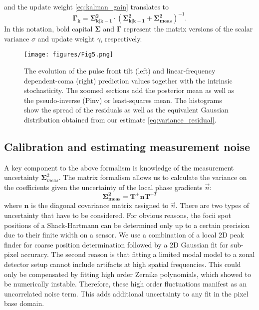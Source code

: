 \documentclass[9pt, twocolumn,superscriptaddress]{revtex4}
\begin{document}
and the update weight \cref{eq:kalman_gain} translates to
\begin{equation}
    \boldsymbol{\Gamma_k} = \boldsymbol{\Sigma^2_{k|k-1}}\cdot\left( \boldsymbol{\Sigma^2_{k|k-1}} +\boldsymbol{\Sigma^2_\text{meas}}\right)^{-1}.
\end{equation}
In this notation, bold capital $\boldsymbol{\Sigma}$ and $\boldsymbol{\Gamma}$ represent the matrix versions of the scalar variance $\sigma$ and update weight $\gamma$, respectively.

\begin{figure*}[]
    \centering
    \texttt{[image: figures/Fig5.png]}
    \caption{The evolution of the pulse front tilt (left) and linear-frequency dependent-coma (right) prediction values together with the intrinsic stochasticity. The zoomed sections add the posterior mean as well as the pseudo-inverse (Pinv) or least-squares mean. The histograms show the spread of the residuals as well as the equivalent Gaussian distribution obtained from our estimate \cref{eq:variance_residual}.}
    \label{fig:pft_plot}
\end{figure*}

\subsection{Calibration and estimating measurement noise}\label{sec:measurement-noise}

A key component to the above formalism is knowledge of the measurement uncertainty $\boldsymbol{\Sigma}^2_{meas}$. The matrix formalism allows us to calculate the variance on the coefficients given the uncertainty of the local phase gradients $\vec{n}$:
\begin{equation}
    \boldsymbol{\Sigma^2_\text{meas}} = \mathbf{T^+} \mathbf{n} \mathbf{T}^{+T}
\end{equation}
where $\mathbf{n}$ is the diagonal covariance matrix assigned to $\vec{n}$.
There are two types of uncertainty that have to be considered. For obvious reasons, the focii spot positions of a Shack-Hartmann can be determined only up to a certain precision due to their finite width on a sensor. We use a combination of a local 2D peak finder for coarse position determination followed by a 2D Gaussian fit for sub-pixel accuracy.
The second reason is that fitting a limited modal model to a zonal detector setup cannot include artifacts at high spatial frequencies. This could only be compensated by fitting high order Zernike polynomials, which showed to be numerically instable. Therefore, these high order fluctuations manifest as an uncorrelated noise term. This adds additional uncertainty to any fit in the pixel base domain.
\end{document}

